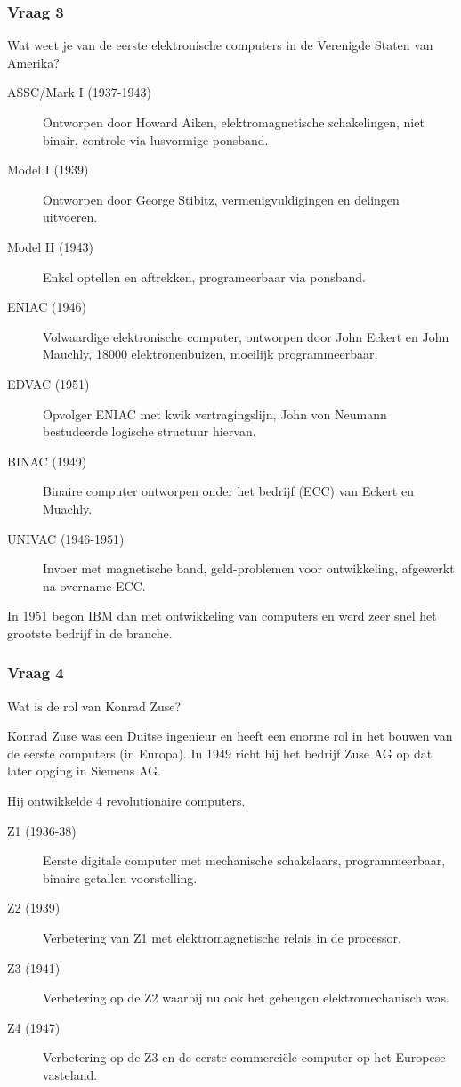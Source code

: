 \documentclass[../main.tex]{subfiles}
\begin{document}
\subsubsection{Vraag 3}
\begin{question} Wat weet je van de eerste elektronische computers in de Verenigde Staten van Amerika?  \end{question}
\begin{solution}
		\begin{description}
				\item[ASSC/Mark I (1937-1943)]
						Ontworpen door Howard Aiken, elektromagnetische schakelingen, niet binair, controle via lusvormige ponsband.
				\item[Model I (1939)] Ontworpen door George Stibitz, vermenigvuldigingen en delingen uitvoeren.
				\item[Model II (1943)] Enkel optellen en aftrekken, programeerbaar via ponsband. 
				\item[ENIAC (1946)] Volwaardige elektronische computer, ontworpen door John Eckert en John Mauchly, 18000 elektronenbuizen, moeilijk programmeerbaar.
				\item[EDVAC (1951)] Opvolger ENIAC met kwik vertragingslijn, John von Neumann bestudeerde logische structuur hiervan.
				\item[BINAC (1949)] Binaire computer ontworpen onder het bedrijf (ECC) van Eckert en Muachly.
				\item[UNIVAC (1946-1951)] Invoer met magnetische band, geld-problemen voor ontwikkeling, afgewerkt na overname ECC.
		\end{description}
		In 1951 begon IBM dan met ontwikkeling van computers en werd zeer snel het grootste bedrijf in de branche.
\end{solution}

\subsubsection{Vraag 4}
\begin{question}
Wat is de rol van Konrad Zuse?
\end{question}
\begin{solution}
Konrad Zuse was een Duitse ingenieur en heeft een enorme rol in het bouwen van de eerste computers (in Europa).
In 1949 richt hij het bedrijf Zuse AG op dat later opging in Siemens AG.

Hij ontwikkelde 4 revolutionaire computers.
\begin{description}
		\item[Z1 (1936-38)] Eerste digitale computer met mechanische schakelaars, programmeerbaar, binaire getallen voorstelling.
		\item[Z2 (1939)] Verbetering van Z1 met elektromagnetische relais in de processor.
		\item[Z3 (1941)] Verbetering op de Z2 waarbij nu ook het geheugen elektromechanisch was.
		\item[Z4 (1947)] Verbetering op de Z3 en de eerste commerci\"ele computer op het Europese vasteland.
\end{description}
\end{solution}
\end{document}
